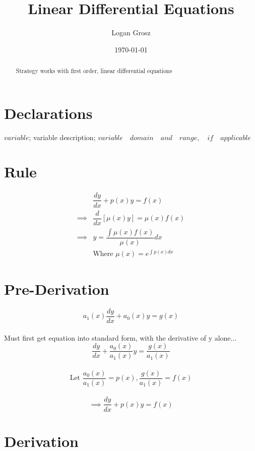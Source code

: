 \documentclass{article}
\begin{document}
	
\author{Logan Grosz}
\title{Linear Differential Equations}
\date{\today}

\maketitle

\begin{abstract}
	Strategy works with first order, linear differential equations
\end{abstract}

\section{Declarations}

$variable$; variable description; $variable\quad domain\quad and\quad range,\quad if\quad applicable$

\section{Rule}

\begin{align*}
&\dfrac{dy}{dx}+p(x)y=f(x)\\
\implies&\dfrac{d}{dx}[\mu(x)y]=\mu(x)f(x)\\
\implies&y=\dfrac{\int\mu(x)f(x)}{\mu(x)}dx\\
&\text{Where }\mu(x)=e^{\int p(x)dx}
\end{align*}

\section{Pre-Derivation}
$$a_1(x)\dfrac{dy}{dx}+a_0(x)y=g(x)$$\\
Must first get equation into standard form, with the derivative of y alone...
$$\dfrac{dy}{dx}+\dfrac{a_0(x)}{a_1(x)}y=\dfrac{g(x)}{a_1(x)}$$\\
$$\text{Let }\dfrac{a_0(x)}{a_1(x)}=p(x),\dfrac{g(x)}{a_1(x)}=f(x)$$\\
$$\implies\dfrac{dy}{dx}+p(x)y=f(x)$$

\section{Derivation}
\end{document}
